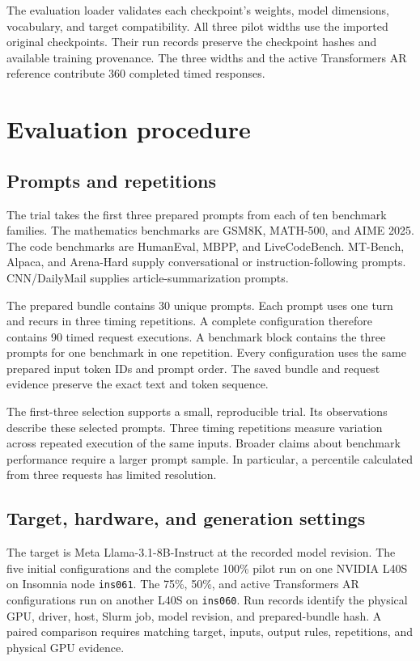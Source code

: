 \documentclass[conference,onecolumn]{IEEEtran}
\begin{document}
The evaluation loader validates each checkpoint's weights, model dimensions, vocabulary, and target compatibility. All three pilot widths use the imported original checkpoints. Their run records preserve the checkpoint hashes and available training provenance. The three widths and the active Transformers AR reference contribute 360 completed timed responses.

\section{Evaluation procedure}
\subsection{Prompts and repetitions}
The trial takes the first three prepared prompts from each of ten benchmark families. The mathematics benchmarks are GSM8K, MATH-500, and AIME 2025. The code benchmarks are HumanEval, MBPP, and LiveCodeBench. MT-Bench, Alpaca, and Arena-Hard supply conversational or instruction-following prompts. CNN/DailyMail supplies article-summarization prompts.

The prepared bundle contains 30 unique prompts. Each prompt uses one turn and recurs in three timing repetitions. A complete configuration therefore contains 90 timed request executions. A benchmark block contains the three prompts for one benchmark in one repetition. Every configuration uses the same prepared input token IDs and prompt order. The saved bundle and request evidence preserve the exact text and token sequence.

The first-three selection supports a small, reproducible trial. Its observations describe these selected prompts. Three timing repetitions measure variation across repeated execution of the same inputs. Broader claims about benchmark performance require a larger prompt sample. In particular, a percentile calculated from three requests has limited resolution.

\subsection{Target, hardware, and generation settings}
The target is Meta Llama-3.1-8B-Instruct at the recorded model revision. The five initial configurations and the complete 100\% pilot run on one NVIDIA L40S on Insomnia node \texttt{ins061}. The 75\%, 50\%, and active Transformers AR configurations run on another L40S on \texttt{ins060}. Run records identify the physical GPU, driver, host, Slurm job, model revision, and prepared-bundle hash. A paired comparison requires matching target, inputs, output rules, repetitions, and physical GPU evidence.
\end{document}
